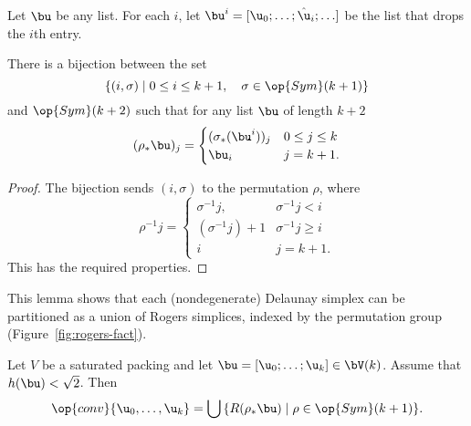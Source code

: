 \begin{definition}
Let $\bu$ be any list.
For each $i$,  let
$\bu^i = [\u_0;\ldots;\hat\u_i;\ldots]$ be the list that drops the $i$th entry.
\end{definition}

\begin{lemma}
\label{lemma:coset-bijection} 
There is a bijection between the set 
\[  
\{(i,\sigma)\mid 0\le i\le k+1,\quad \sigma\in \op{Sym}(k+1)\}
\] 
and $\op{Sym}(k+2)$ such that for any list $\bu$ of length $k+2$
\[
(\rho_*\bu)_j = \begin{cases} (\sigma_*(\bu^i))_j&0\le j \le k\\
  \bu_i & j=k+1.
\end{cases}
\]
\end{lemma}

\begin{proof} 
The bijection sends $(i,\sigma)$ to the permutation $\rho$, where
\[  
\rho^{-1} j = \begin{cases} 
\sigma^{-1} j, & \sigma^{-1} j<i\\
(\sigma^{-1}j)+1 & \sigma^{-1} j \ge i\\
i& j=k+1.
\end{cases}
\] 
This has the required properties.
\end{proof}

This lemma shows that each (nondegenerate) Delaunay simplex can be
partitioned as a union of Rogers simplices, indexed by the permutation
group (Figure~\ref{fig:rogers-fact}).

\figYAJOTSL %

\begin{lemma}\label{lemma:Rconv}  
  Let $V$ be a saturated packing and let $\bu = [\u_0;\ldots;\u_k]\in
  \bV(k)$.  Assume that $h(\bu)<\sqrt2$.  
  Then
\[  
\op{conv}\{ \u_0,\ldots, \u_k\} = \bigcup \,\{ R(\rho_*\bu) \mid \rho\in \op{Sym}(k+1)\}.
\] 
\end{lemma}
%

